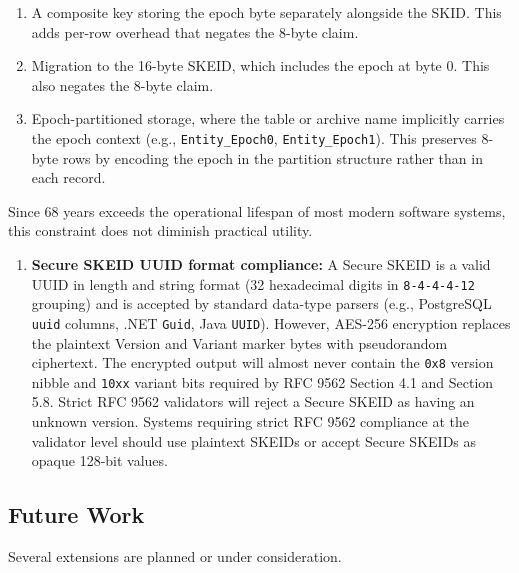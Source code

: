 \documentclass[fleqn,10pt,lineno]{wlpeerj}
\providecommand{\tightlist}{%
  \setlength{\itemsep}{0pt}\setlength{\parskip}{0pt}}
\begin{document}
\begin{enumerate}
  \begin{enumerate}
  \def\labelenumii{\arabic{enumii}.}
  \item
    A composite key storing the epoch byte separately alongside the
    SKID. This adds per-row overhead that negates the 8-byte claim.
  \item
    Migration to the 16-byte SKEID, which includes the epoch at byte 0.
    This also negates the 8-byte claim.
  \item
    Epoch-partitioned storage, where the table or archive name
    implicitly carries the epoch context (e.g., \texttt{Entity\_Epoch0},
    \texttt{Entity\_Epoch1}). This preserves 8-byte rows by encoding the
    epoch in the partition structure rather than in each record.
  \end{enumerate}
\end{enumerate}

Since 68 years exceeds the operational lifespan of most modern software
systems, this constraint does not diminish practical utility.

\begin{enumerate}
\def\labelenumi{\arabic{enumi}.}
\setcounter{enumi}{5}
\tightlist
\item
  \textbf{Secure SKEID UUID format compliance:} A Secure SKEID is a
  valid UUID in length and string format (32 hexadecimal digits in
  \texttt{8-4-4-4-12} grouping) and is accepted by standard data-type
  parsers (e.g., PostgreSQL \texttt{uuid} columns, .NET \texttt{Guid},
  Java \texttt{UUID}). However, AES-256 encryption replaces the
  plaintext Version and Variant marker bytes with pseudorandom
  ciphertext. The encrypted output will almost never contain the
  \texttt{0x8} version nibble and \texttt{10xx} variant bits required by
  RFC 9562 Section 4.1 and Section 5.8. Strict RFC 9562 validators will
  reject a Secure SKEID as having an unknown version. Systems requiring
  strict RFC 9562 compliance at the validator level should use plaintext
  SKEIDs or accept Secure SKEIDs as opaque 128-bit values.
\end{enumerate}

\subsection{Future Work}\label{future-work}

Several extensions are planned or under consideration.
\end{document}
